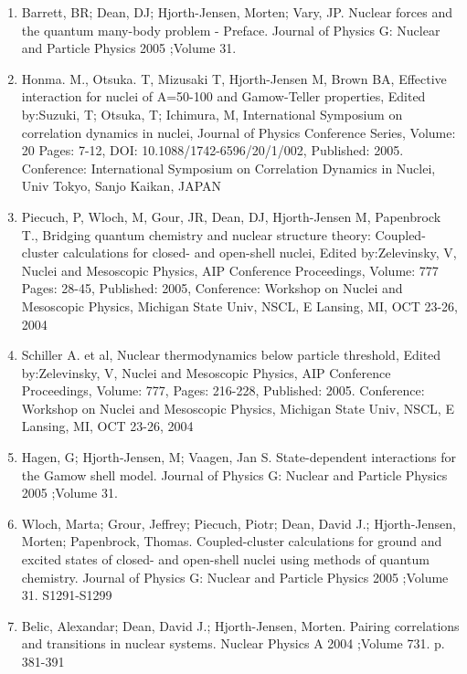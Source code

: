 \documentclass[a4wide,10pt]{article}
\begin{document}
\begin{enumerate}
\item Barrett, BR; Dean, DJ; Hjorth-Jensen, Morten; Vary, JP.  Nuclear forces and the quantum many-body problem - Preface. Journal of Physics G: Nuclear and Particle Physics 2005 ;Volume 31.

\item Honma. M., Otsuka. T, Mizusaki T, Hjorth-Jensen M, Brown BA, Effective interaction for nuclei of A=50-100 and Gamow-Teller properties, Edited by:Suzuki, T; Otsuka, T; Ichimura, M, International Symposium on correlation dynamics in nuclei, Journal of Physics Conference Series, Volume: 20  Pages: 7-12, DOI: 10.1088/1742-6596/20/1/002, Published: 2005. Conference: International Symposium on Correlation Dynamics in Nuclei, Univ Tokyo, Sanjo Kaikan, JAPAN

\item Piecuch, P, Wloch, M,  Gour, JR, Dean, DJ, Hjorth-Jensen M,  Papenbrock T., Bridging quantum chemistry and nuclear structure theory: Coupled-cluster calculations for closed- and open-shell nuclei, Edited by:Zelevinsky, V, Nuclei and Mesoscopic Physics, AIP Conference Proceedings, Volume: 777  Pages: 28-45, Published: 2005, Conference: Workshop on Nuclei and Mesoscopic Physics, Michigan State Univ, NSCL, E Lansing, MI, OCT 23-26, 2004

\item Schiller A. et al,  Nuclear thermodynamics below particle threshold, Edited by:Zelevinsky, V, Nuclei and Mesoscopic Physics, AIP Conference Proceedings, Volume: 777, Pages: 216-228, Published: 2005. Conference: Workshop on Nuclei and Mesoscopic Physics, Michigan State Univ, NSCL, E Lansing, MI, OCT 23-26, 2004

\item Hagen, G; Hjorth-Jensen, M; Vaagen, Jan S.  State-dependent interactions for the Gamow shell model. Journal of Physics G: Nuclear and Particle Physics 2005 ;Volume 31. 

\item Wloch, Marta; Grour, Jeffrey; Piecuch, Piotr; Dean, David J.; Hjorth-Jensen, Morten; Papenbrock, Thomas.  Coupled-cluster calculations for ground and excited states of closed- and open-shell nuclei using methods of quantum chemistry. Journal of Physics G: Nuclear and Particle Physics 2005 ;Volume 31.  S1291-S1299

\item Belic, Alexandar; Dean, David J.; Hjorth-Jensen, Morten.  Pairing correlations and transitions in nuclear systems. Nuclear Physics A 2004 ;Volume 731. p. 381-391


\end{enumerate}
\end{document}
